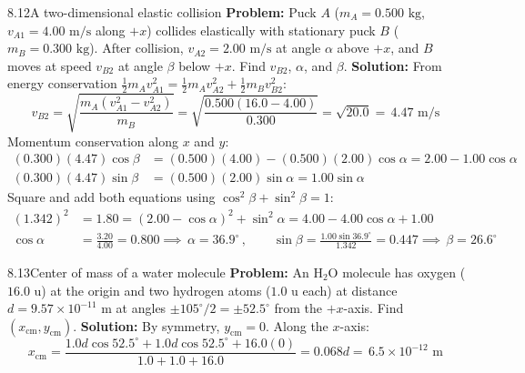 \documentclass[11pt,a4paper,openany,oneside]{book}
\newcommand{\eqbox}[1]{\boxed{\,#1\,}}
\numberwithin{equation}{chapter}
\newcommand{\bk}[1]{\texorpdfstring{\enspace{\normalfont\small\color{slate}[Book #1]}}{ [Book #1]}}
\begin{document}
\begin{example}{8.12}{A two-dimensional elastic collision\bk{p.\ 258}}
\textbf{Problem:} Puck $A$ ($m_A = 0.500\text{ kg}$, $v_{A1} = 4.00\text{ m/s}$ along $+x$) collides elastically with stationary puck $B$ ($m_B = 0.300\text{ kg}$). After collision, $v_{A2} = 2.00\text{ m/s}$ at angle $\alpha$ above $+x$, and $B$ moves at speed $v_{B2}$ at angle $\beta$ below $+x$. Find $v_{B2}$, $\alpha$, and $\beta$.
\tcblower
\textbf{Solution:} From energy conservation $\frac{1}{2}m_A v_{A1}^2 = \frac{1}{2}m_A v_{A2}^2 + \frac{1}{2}m_B v_{B2}^2$:
\begin{equation*}
  v_{B2} = \sqrt{\frac{m_A(v_{A1}^2 - v_{A2}^2)}{m_B}} = \sqrt{\frac{0.500(16.0 - 4.00)}{0.300}} = \sqrt{20.0} = \eqbox{4.47\text{ m/s}}
\end{equation*}
Momentum conservation along $x$ and $y$:
\begin{align*}
  (0.300)(4.47)\cos\beta &= (0.500)(4.00) - (0.500)(2.00)\cos\alpha = 2.00 - 1.00\cos\alpha\\
  (0.300)(4.47)\sin\beta &= (0.500)(2.00)\sin\alpha = 1.00\sin\alpha
\end{align*}
Square and add both equations using $\cos^2\beta + \sin^2\beta = 1$:
\begin{align*}
  (1.342)^2 &= 1.80 = (2.00 - \cos\alpha)^2 + \sin^2\alpha = 4.00 - 4.00\cos\alpha + 1.00\\
  \cos\alpha &= \frac{3.20}{4.00} = 0.800 \implies \eqbox{\alpha = 36.9^\circ}, \qquad \sin\beta = \frac{1.00\sin 36.9^\circ}{1.342} = 0.447 \implies \eqbox{\beta = 26.6^\circ}
\end{align*}
\end{example}

\begin{example}{8.13}{Center of mass of a water molecule\bk{p.\ 259}}
\textbf{Problem:} An $\text{H}_2\text{O}$ molecule has oxygen ($16.0\text{ u}$) at the origin and two hydrogen atoms ($1.0\text{ u}$ each) at distance $d = 9.57\times 10^{-11}\text{ m}$ at angles $\pm 105^\circ/2 = \pm 52.5^\circ$ from the $+x$-axis. Find $(x_{\text{cm}}, y_{\text{cm}})$.
\tcblower
\textbf{Solution:} By symmetry, $y_{\text{cm}} = 0$. Along the $x$-axis:
\begin{equation*}
  x_{\text{cm}} = \frac{1.0d\cos 52.5^\circ + 1.0d\cos 52.5^\circ + 16.0(0)}{1.0 + 1.0 + 16.0} = 0.068d = \eqbox{6.5\times 10^{-12}\text{ m}}
\end{equation*}
\end{example}
\end{document}
